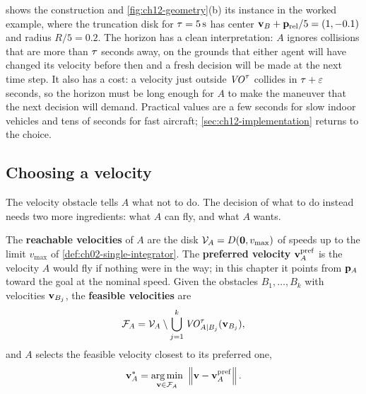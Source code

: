  shows the construction and \cref{fig:ch12-geometry}(b)
its instance in the worked example, where the truncation disk for
$\tau = 5\,\mathrm{s}$ has center $\mathbf{v}_B + \mathbf{p}_{\mathrm{rel}}/5 = (1,-0.1)$
and radius $R/5 = 0.2$. The horizon has a clean interpretation: $A$ ignores
collisions that are more than $\tau$ seconds away, on the grounds that either
agent will have changed its velocity before then and a fresh decision will be
made at the next time step. It also has a cost: a velocity just outside
$\mathit{VO}^{\tau}$ collides in $\tau + \varepsilon$ seconds, so the horizon must be long
enough for $A$ to make the maneuver that the next decision will demand.
Practical values are a few seconds for slow indoor vehicles and tens of seconds
for fast aircraft; \cref{sec:ch12-implementation} returns to the choice.

\subsection{Choosing a velocity}
\label{sec:ch12-choosing}

The velocity obstacle tells $A$ what not to do. The decision of what to do
instead needs two more ingredients: what $A$ can fly, and what $A$ wants.

\begin{definition}
\label{def:ch12-feasible}
The \textbf{reachable velocities} of $A$ are the
disk $\mathcal{V}_A = D(\mathbf{0},v_{\max})$ of speeds up to the limit
$v_{\max}$ of \cref{def:ch02-single-integrator}. The \textbf{preferred
velocity} $\mathbf{v}_A^{\mathrm{pref}}$ is the velocity
$A$ would fly if nothing were in the way; in this chapter it points from
$\mathbf{p}_A$ toward the goal at the nominal speed. Given the obstacles
$B_1,\dots,B_k$ with velocities $\mathbf{v}_{B_j}$, the \textbf{feasible
velocities} are
\begin{equation}
  \mathcal{F}_A = \mathcal{V}_A \setminus
    \bigcup_{j=1}^{k} \mathit{VO}^{\tau}_{A|B_j}(\mathbf{v}_{B_j}),
  \label{eq:ch12-feasible}
\end{equation}
and $A$ selects the feasible velocity closest to its preferred one,
\begin{equation}
  \vel_A^{*} = \argmin_{\vel \in \mathcal{F}_A}\ \norm{\vel - \vel_A^{\mathrm{pref}}} .
  \label{eq:ch12-cost}
\end{equation}
\end{definition}

